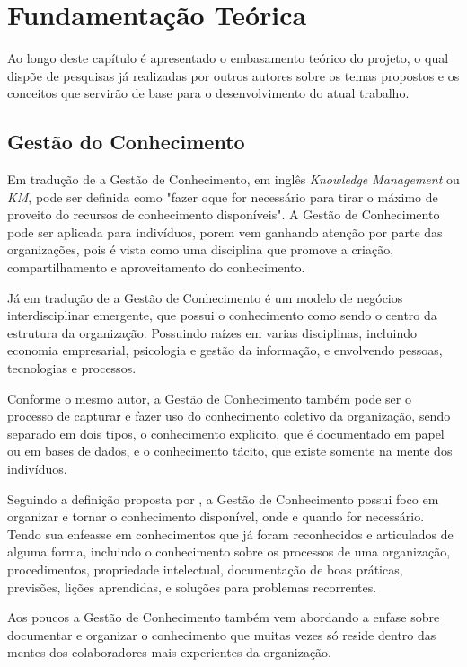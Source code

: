 
\chapter{Fundamentação Teórica}\label{chap:background}
Ao longo deste capítulo é apresentado o embasamento teórico do projeto,
o qual dispõe de pesquisas já realizadas por outros autores sobre os temas
propostos e os conceitos que servirão de base para o desenvolvimento do
atual trabalho.

\section{Gestão do Conhecimento}\label{sec:business}

Em tradução de \cite[p. 4]{2014:Becerra} a Gestão de Conhecimento,
em inglês \emph{Knowledge Management} ou \emph{KM}, pode ser definida
como "fazer oque for necessário para tirar o máximo de proveito do
recursos de conhecimento disponíveis". A Gestão de Conhecimento pode
ser aplicada para indivíduos, porem vem ganhando atenção por parte
das organizações, pois é vista como uma disciplina que promove
a criação, compartilhamento e aproveitamento do conhecimento.

Já em tradução de \citep[p. 26]{2007:Awad} a Gestão de Conhecimento
é um modelo de negócios interdisciplinar emergente, que possui
o conhecimento como sendo o centro da estrutura da organização.
Possuindo raízes em varias disciplinas, incluindo economia empresarial,
psicologia e gestão da informação, e envolvendo pessoas, tecnologias e
processos.

Conforme o mesmo autor, a Gestão de Conhecimento também pode ser
o processo de capturar e fazer uso do conhecimento coletivo da organização,
sendo separado em dois tipos, o conhecimento explicito, que é documentado
em papel ou em bases de dados, e o conhecimento tácito, que existe
somente na mente dos indivíduos.

Seguindo a definição proposta por \cite{2014:Becerra}, a
Gestão de Conhecimento possui foco em organizar e tornar o
conhecimento disponível, onde e quando for necessário.
Tendo sua enfeasse em conhecimentos que já foram reconhecidos e
articulados de alguma forma, incluindo o conhecimento sobre os
processos de uma organização, procedimentos, propriedade intelectual,
documentação de boas práticas, previsões, lições aprendidas, e soluções
para problemas recorrentes.

Aos poucos a Gestão de Conhecimento também vem abordando a enfase sobre documentar
e organizar o conhecimento que muitas vezes só reside dentro das mentes
dos colaboradores mais experientes da organização.

